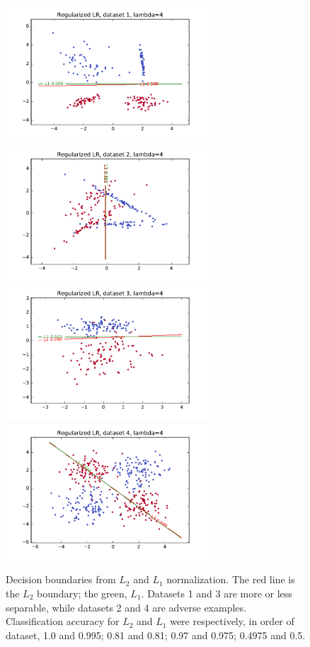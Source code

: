 \documentclass{article}
\begin{document}
\begin{multicols}{2}
\begin{figure}
   \centering
   \includegraphics[width=3in]{img/1-3-1.pdf}
   \includegraphics[width=3in]{img/1-3-2.pdf}
   \includegraphics[width=3in]{img/1-3-3.pdf}
   \includegraphics[width=3in]{img/1-3-4.pdf}
   \caption{Decision boundaries from $L_2$ and $L_1$ normalization. The red line is the $L_2$ boundary; the green, $L_1$. Datasets 1 and 3 are more or less separable, while datasets 2 and 4 are adverse examples. Classification accuracy for $L_2$ and $L_1$ were respectively, in order of dataset, 1.0 and 0.995; 0.81 and 0.81; 0.97 and 0.975; 0.4975 and 0.5.}
   \label{fig:1-3-boundaries}
\end{figure}


\end{multicols}
\end{document}
